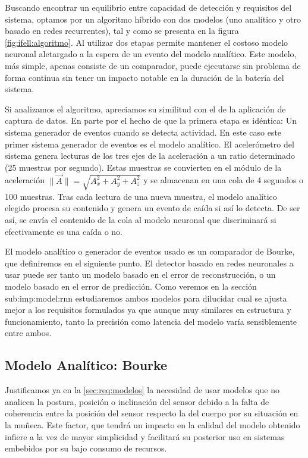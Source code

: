 Buscando encontrar un equilibrio entre capacidad de detección y requisitos del sistema, optamos por un algoritmo híbrido con dos modelos (uno analítico y otro basado en redes recurrentes), tal y como se presenta en la figura \ref{fig:ifell:algoritmo}. Al utilizar dos etapas permite mantener el costoso modelo neuronal aletargado a la espera de un evento del modelo analítico. Este modelo, más simple, apenas consiste de un comparador, puede ejecutarse sin problema de forma continua sin tener un impacto notable en la duración de la batería del sistema. 


Si analizamos el algoritmo, apreciamos su similitud con el de la aplicación de captura de datos. En parte por el hecho de que la primera etapa es idéntica: Un sistema generador de eventos cuando se detecta actividad. En este caso este primer sistema generador de eventos es el modelo analítico. El acelerómetro del sistema genera lecturas de los tres ejes de la aceleración a un ratio determinado (25 muestras por segundo). Estas muestras se convierten en el módulo de la aceleración $\|\vec{A}\|=\sqrt{A_x^2 + A_y^2 + A_z^2}$ y se almacenan en una cola de 4 segundos o 100 muestras. Tras cada lectura de una nueva muestra, el modelo analítico elegido procesa su contenido y genera un evento de caída si así lo detecta. De ser así, se envía el contenido de la cola al modelo neuronal que discriminará si efectivamente es una caída o no.

El modelo analítico o generador de eventos usado es un comparador de Bourke, que definiremos en el siguiente punto. El detector basado en redes neuronales a usar puede ser tanto un modelo basado en el error de reconstrucción, o un modelo basado en el error de predicción. Como veremos en la sección \refname{sub:imp:model:rnn} estudiaremos ambos modelos para dilucidar cual se ajusta mejor a los requisitos formulados ya que aunque muy similares en estructura y funcionamiento, tanto la precisión como latencia del modelo varía sensiblemente entre ambos.

\subsection{Modelo Analítico: Bourke}\label{sub:imp:model:analitico}

Justificamos ya en la \autoref{sec:req:modelos} la necesidad de usar modelos que no analicen la postura, posición o inclinación del sensor debido a la falta de coherencia entre la posición del sensor respecto la del cuerpo por su situación en la muñeca. Este factor, que tendrá un impacto en la calidad del modelo obtenido infiere a la vez de mayor simplicidad y facilitará su posterior uso en sistemas embebidos por su bajo consumo de recursos.

